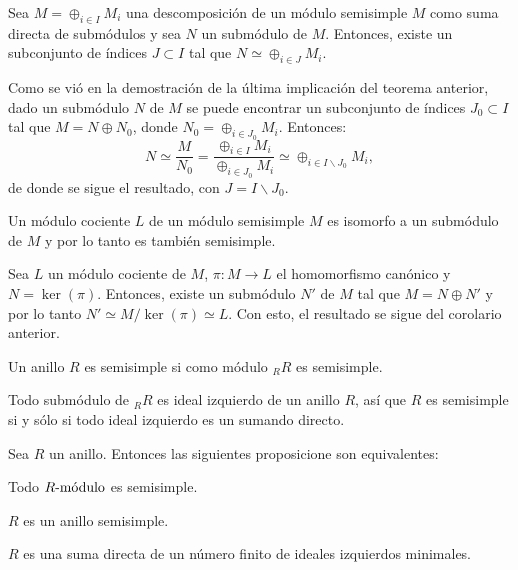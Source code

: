\begin{corolario}
Sea $M = \oplus_{i \in I}M_i$ una descomposición de un módulo semisimple $M$ como suma directa de submódulos y sea $N$ un submódulo de $M$. Entonces, existe un subconjunto de índices $J \subset I $ tal que $N \simeq \oplus_{i \in J}M_i$.
\end{corolario}
\begin{proof*}
Como se vió en la demostración de la última implicación del teorema anterior, dado un submódulo $N$ de $M$ se puede encontrar un subconjunto de índices $J_0 \subset I$  tal que $M = N \oplus N_0$, donde $N_0 = \oplus_{i \in J_0}M_i$. Entonces:
\[ N \simeq \frac{M}{N_0} = \frac{\oplus_{i \in I}M_i}{\oplus_{i \in J_0}M_i} \simeq \oplus_{i \in I \backslash J_0} M_i, \] de donde se sigue el resultado, con $J = I \backslash J_0$.
\end{proof*}
\begin{corolario}
Un módulo cociente $L$ de un módulo semisimple $M$ es isomorfo a un submódulo de $M$ y por lo tanto es también semisimple.
\end{corolario}
\begin{proof*}
Sea $L$ un módulo cociente de $M$, $\pi \colon M \to L$ el homomorfismo canónico y $N = \ker(\pi)$. Entonces, existe un submódulo $N'$ de $M$ tal que $M = N \oplus N'$ y por lo tanto $N'\simeq M/\ker(\pi) \simeq L$. Con esto, el resultado se sigue del corolario anterior.
\end{proof*}
\begin{definicion}
Un anillo $R$ es semisimple si como módulo $_RR$ es semisimple. 
\end{definicion}
Todo submódulo de $_RR$ es ideal izquierdo de un anillo $R$, así que $R$ es semisimple si y sólo si todo ideal izquierdo es un sumando directo.
\begin{teorema}
Sea $R$ un anillo. Entonces las siguientes proposicione son equivalentes:
\begin{bulletList}
\item\label{item:rssimple1} Todo $\modulo{R}$ es semisimple.
\item\label{item:rssimple2} $R$ es un anillo semisimple.
\item\label{item:rssimple3} $R$ es una suma directa de un número finito de ideales izquierdos minimales.
\end{bulletList}
\end{teorema}

